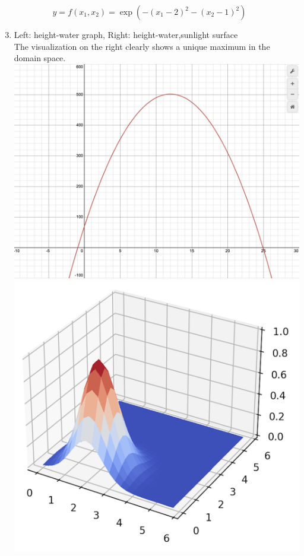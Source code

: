 \documentclass{harvardml}
\theoremstyle{definition}
\theoremstyle{plain}
\begin{document}
\begin{solution}
$$y = f(x_1, x_2) = \exp\left(-(x_1 - 2)^2 - (x_2 - 1)^2 \right)$$
\begin{enumerate}
    \setcounter{enumi}{2}
    \item Left: height-water graph, Right: height-water,sunlight surface\\
    The visualization on the right clearly shows a unique maximum in the domain space.\\
    \includegraphics[width=0.45\linewidth]{P2Plant.png}
    \includegraphics[width=0.45\linewidth]{P2Sunlight.png}

\end{enumerate}
\end{solution}
\end{document}
